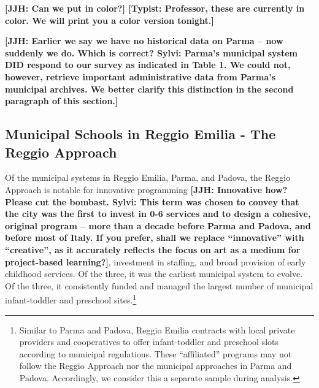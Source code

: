 \textbf{[JJH: Can we put in color?] [Typist: Professor, these are currently in color. We will print you a color version tonight.]}

\textbf{[JJH: Earlier we say we have no historical data on Parma -- now suddenly we do. Which is correct? Sylvi: Parma's municipal system DID respond to our survey as indicated in Table 1. We could not, however, retrieve important administrative data from Parma's municipal archives. We better clarify this distinction in the second paragraph of this section.]}


\subsection{Municipal Schools in Reggio Emilia - The Reggio Approach}

Of the municipal systems in Reggio Emilia, Parma, and Padova, the Reggio Approach is notable for innovative programming \textbf{[JJH: Innovative how? Please cut the bombast. Sylvi: This term was chosen to convey that the city was the first to invest in 0-6 services and to design a cohesive, original program -- more than a decade before Parma and Padova, and before most of Italy. If you prefer, shall we replace ``innovative'' with ``creative'', as it accurately reflects the focus on art as a medium for project-based learning?]}, investment in staffing, and broad provision of early childhood services. Of the three, it was the earliest municipal system to evolve. Of the three, it consistently funded and managed the largest number of municipal infant-toddler and preschool sites.\footnote{Similar to Parma and Padova, Reggio Emilia contracts with local private providers and cooperatives to offer infant-toddler and preschool slots according to municipal regulations. These ``affiliated'' programs may not follow the Reggio Approach nor the municipal approaches in Parma and Padova. Accordingly, we consider this a separate sample during analysis.} 

